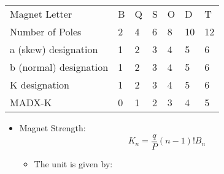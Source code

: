 \documentclass[openright,twoside,headsepline,bibliography=totoc]{scrbook}
\begin{document}
\begin{center}
  \begin{tabular}{lllllll}
  Magnet Letter          & B & Q & S & O & D & T \\
  Number of Poles        & 2 & 4 & 6 & 8 & 10 & 12 \\
  a (skew) designation   & 1 & 2 & 3 & 4 & 5 & 6 \\
  b (normal) designation & 1 & 2 & 3 & 4 & 5 & 6 \\
  K designation          & 1 & 2 & 3 & 4 & 5 & 6 \\
  MADX-K                 & 0 & 1 & 2 & 3 & 4 & 5 \\
  \end{tabular}
\end{center}

\begin{itemize}
\item
  Magnet Strength:
  \begin{equation}K_{n} = \frac{q}{P} (n-1)!B_n\label{eq:magnet_strength}\end{equation}

  \begin{itemize}
  \item
    The unit is given by:


\end{itemize}
\end{itemize}
\end{document}
